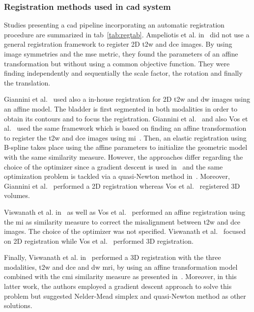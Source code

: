 \subsubsection{Registration methods used in \ac{cad} system}\label{subsubsec:regrev}

Studies presenting a \ac{cad} pipeline incorporating an automatic registration procedure are summarized in \ac{tab}~\ref{tab:regtab}. 
Ampeliotis et al. in~\cite{Ampeliotis2007,Ampeliotis2008} did not use a general registration framework  to register 2D \ac{t2w} and \ac{dce} images. By using image symmetries and the \ac{mse} metric, they found the parameters of an affine transformation but without using a common objective function. They were finding independently and sequentially the scale factor, the rotation and finally the translation.

Giannini et al.~\cite{Giannini2013} used also a in-house registration for 2D \ac{t2w} and \ac{dw} images using an affine model. The bladder is first segmented in both modalities in order to obtain its contours and to focus the registration.
Giannini et al.~\cite{Giannini2013} and also Vos et al.~\cite{Vos2010} used the same framework which is based on finding an affine transformation to register the \ac{t2w} and \ac{dce} images using \ac{mi}~\cite{Rueckert1999}. Then, an elastic registration using B-spline takes place using the affine parameters to initialize the geometric model with the  same similarity measure. However, the approaches differ regarding the choice of the optimizer since a gradient descent is used in~\cite{Giannini2013} and the same optimization problem is tackled via a quasi-Newton method in~\cite{Vos2010}. Moreover, Giannini et al.~\cite{Giannini2013} performed a 2D registration whereas Vos et al.~\cite{Vos2010} registered 3D volumes.

Viswanath et al. in~\cite{Viswanath2008a,Viswanath2009} as well as Vos et al.~\cite{Vos2008} performed an affine registration using the \ac{mi} as similarity measure to correct the misalignment between \ac{t2w} and \ac{dce} images. The choice of the optimizer was not specified. Viswanath et al.~\cite{Viswanath2008a,Viswanath2009} focused on 2D registration while Vos et al.~\cite{Vos2008} performed 3D registration.

Finally, Viswanath et al. in~\cite{Viswanath2011} performed a 3D registration with the three modalities, \ac{t2w} and \ac{dce} and \ac{dw} \ac{mri}, by using an affine transformation model combined with the \ac{cmi} similarity measure as presented in~\cite{Chappelow2011}. Moreover, in this latter work, the authors employed a gradient descent approach to solve this problem but suggested Nelder-Mead simplex and quasi-Newton method as other solutions.

